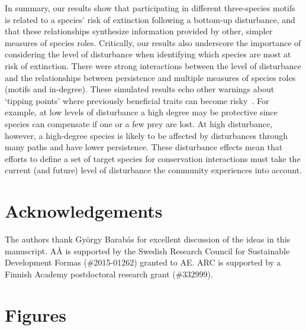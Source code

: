 \documentclass[12pt]{article}
\begin{document}
\begin{spacing}{2.0}
    In summary, our results show that participating in different three-species motifs is related to a species' risk of extinction following a bottom-up disturbance, and that these relationships synthesize information provided by other, simpler measures of species roles.
    Critically, our results also underscore the importance of considering the level of disturbance when identifying which species are most at risk of extinction.
    There were strong interactions between the level of disturbance and the relationships between persistence and multiple measures of species roles (motifs and in-degree).
    These simulated results echo other warnings about `tipping points' where previously beneficial traits can become risky~\citep{Latty2019,Golubski2016,Tylianakis2014}.
    For example, at low levels of disturbance a high degree may be protective since species can compensate if one or a few prey are lost. 
    At high disturbance, however, a high-degree species is likely to be affected by disturbances through many paths and have lower persistence.
    These disturbance effects mean that efforts to define a set of target species for conservation interactions must take the current (and future) level of disturbance the community experiences into account.
    
\section*{Acknowledgements}

    The authors thank György Barabás for excellent discussion of the ideas in this manuscript. AÅ is supported by the Swedish Research Council for Sustainable Development Formas (\#2015-01262) granted to AE. ARC is supported by a Finnish Academy postdoctoral research grant (\#332999).

\clearpage    

\section*{Figures}
    

\end{spacing}
\end{document}
